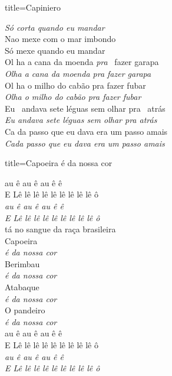 \documentclass[fontsize=14pt, twoside]{scrreprt}
\begin{document}
\begin{multicols*}{2}
\begin{song}{title={Capiniero}}
\begin{verse*}
            \textit{Só corta quando eu mand}\textit{ar} \\
            Nao mexe com o mar imbondo \\
            Só mexe quando eu mandar\\
            Ol ha a cana da moenda \textit{pra} \ fazer garapa\\
            \textit{Olha a cana da moenda pra fazer garapa}\\
            Ol ha o milho do cabão pra fazer fubar\\
            \textit{Olha o milho do cabão pra fazer fubar}\\
            Eu \ andava sete léguas sem olhar pra \ atrás\\
            \textit{Eu andava sete léguas sem olhar pra atrás}\\
            Ca da passo que eu dava era um passo amais\\
            \textit{Cada passo que eu dava era um passo amais}\\
        \end{verse*}
\end{song}

\columnbreak
\begin{song}{title={Capoeira é da nossa cor}}
        \begin{verse*}
            au ê au ê au ê ê\\
            E Lê lê lê lê lê lê lê lê lê ô\\
            \textit{au ê au ê au ê ê}\\
            \textit{E Lê lê lê lê lê lê lê lê lê ô}\\
            tá no sangue da raça brasileira\\
            Capoeira\\
            \textit{é da nossa cor}\\
            Berimbau\\
            \textit{é da nossa cor}\\
            Atabaque\\
            \textit{é da nossa cor}\\
            O pandeiro\\
            \textit{é da nossa cor}\\
            au ê au ê au ê ê\\
            E Lê lê lê lê lê lê lê lê lê ô\\
            \textit{au ê au ê au ê ê}\\
            \textit{E Lê lê lê lê lê lê lê lê lê ô}\\
        \end{verse*}
\end{song}


\end{multicols*}
\end{document}
